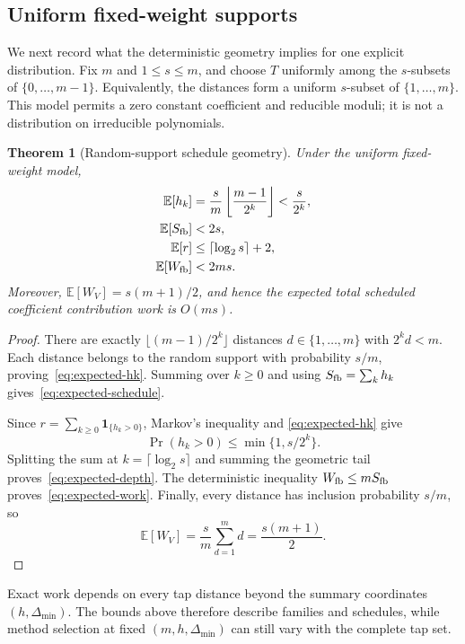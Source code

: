 \documentclass{mcom-l}
\numberwithin{equation}{section}
\newtheorem{theorem}{Theorem}[section]
\theoremstyle{definition}
\theoremstyle{remark}
\newcommand{\Dmin}{\Delta_{\min}}
\newcommand{\Wfb}{W_{\mathrm{fb}}}
\begin{document}
\subsection{Uniform fixed-weight supports}

We next record what the deterministic geometry implies for one explicit
distribution.  Fix $m$ and $1\le s\le m$, and choose $T$ uniformly among the
$s$-subsets of $\{0,\ldots,m-1\}$.  Equivalently, the distances form a
uniform $s$-subset of $\{1,\ldots,m\}$.  This model permits a zero constant
coefficient and reducible moduli; it is not a distribution on irreducible
polynomials.

\begin{theorem}[Random-support schedule geometry]
\label{thm:random-support}
Under the uniform fixed-weight model,
\begin{align}
  \mathbb E[h_k]
    &=\frac{s}{m}\left\lfloor\frac{m-1}{2^k}\right\rfloor
      <\frac{s}{2^k},                                      \label{eq:expected-hk}\\
  \mathbb E[S_{\rm fb}]&<2s,                               \label{eq:expected-schedule}\\
  \mathbb E[r]&\le\lceil\log_2s\rceil+2,                   \label{eq:expected-depth}\\
  \mathbb E[\Wfb]&<2ms.                                    \label{eq:expected-work}
\end{align}
Moreover, $\mathbb E[W_V]=s(m+1)/2$, and hence the expected total scheduled
coefficient contribution work is $O(ms)$.
\end{theorem}
\begin{proof}
There are exactly $\lfloor(m-1)/2^k\rfloor$ distances $d\in\{1,\ldots,m\}$
with $2^kd<m$.  Each distance belongs to the random support with probability
$s/m$, proving~\eqref{eq:expected-hk}.  Summing over $k\ge0$ and using
$S_{\rm fb}=\sum_kh_k$ gives~\eqref{eq:expected-schedule}.

Since $r=\sum_{k\ge0}\mathbf 1_{\{h_k>0\}}$, Markov's inequality and
\eqref{eq:expected-hk} give
\[
  \Pr(h_k>0)\le\min\{1,s/2^k\}.
\]
Splitting the sum at $k=\lceil\log_2s\rceil$ and summing the geometric tail
proves~\eqref{eq:expected-depth}.  The deterministic inequality
$\Wfb\le mS_{\rm fb}$ proves~\eqref{eq:expected-work}.  Finally, every distance
has inclusion probability $s/m$, so
\[
  \mathbb E[W_V]
  =\frac{s}{m}\sum_{d=1}^m d
  =\frac{s(m+1)}{2}.
\]
\end{proof}

Exact work depends on every tap distance beyond the summary coordinates
$(h,\Dmin)$.  The bounds above therefore describe families and schedules,
while method selection at fixed $(m,h,\Dmin)$ can still vary with the complete
tap set.
\end{document}
